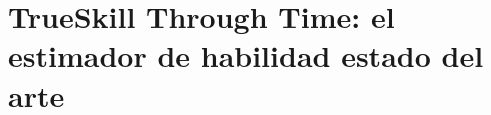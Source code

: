 \documentclass[a4paper,10pt]{book}
\theoremstyle{definition}
\begin{document}
\chapter{TrueSkill Through Time: el estimador de habilidad estado del arte} \label{ch:ttt}
\end{document}
